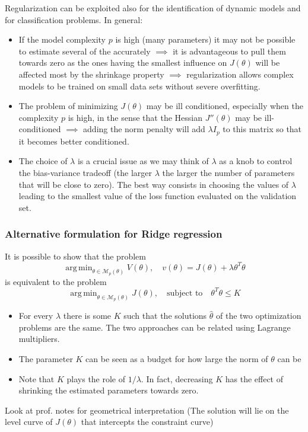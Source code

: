 \documentclass{book}
\DeclareMathOperator*{\argmin}{arg\,min}
\theoremstyle{definition}
\theoremstyle{remark}
\theoremstyle{remark}
\begin{document}
Regularization can be exploited also for the identification of dynamic models and for classification problems. In general: 
\begin{itemize}
    \item If the model complexity $p$ is high (many parameters) it may not be possible to estimate several of the accurately $\implies$ it is advantageous to pull them towards zero as the ones having the smallest influence on $J(\theta)$ will be affected most by the shrinkage property $\implies$ regularization allows complex models to be trained on small data sets without severe overfitting. 
    \item The problem of minimizing $J(\theta)$ may be ill conditioned, especially when the complexity $p$ is high, in the sense that the Hessian $J''(\theta)$ may be ill-conditioned $\implies$ adding the norm penalty will add $\lambda I_p$ to this matrix so that it becomes better conditioned. 
    \item The choice of $\lambda$ is a crucial issue as we may think of $\lambda$ as a knob to control the bias-variance tradeoff (the larger $\lambda$ the larger the number of parameters that will be close to zero). The best way consists in choosing the values of $\lambda$ leading to the smallest value of the loss function evaluated on the validation set. 
\end{itemize}

\subsubsection{Alternative formulation for Ridge regression} 
It is possible to show that the problem 
\[
    \argmin_{\theta\in\mathcal{M}_p(\theta)}V(\theta),\quad v(\theta)=J(\theta) + \lambda\theta^T\theta
\]
is equivalent to the problem 
\[
    \argmin_{\theta\in\mathcal{M}_p(\theta)}J(\theta), \quad \text{subject to}\quad \theta^T\theta\leq K
\]
\begin{itemize}
    \item For every $\lambda$ there is some $K$ such that the solutions $\hat{\theta}$ of the two optimization problems are the same. The two approaches can be related using Lagrange multipliers. 
    \item The parameter $K$ can be seen as a budget for how large the norm of $\theta$ can be 
    \item Note that $K$ plays the role of $1/\lambda$. In fact, decreasing $K$ has the effect of shrinking the estimated parameters towards zero.
\end{itemize}
Look at prof. notes for geometrical interpretation (The solution will lie on the level curve of $J(\theta)$ that intercepts the constraint curve)
\end{document}
